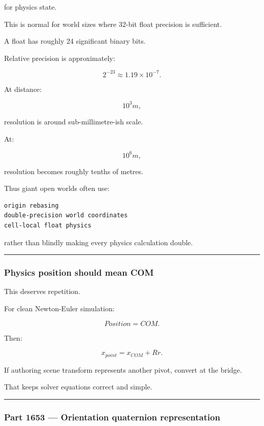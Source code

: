 for physics state.

This is normal for world sizes where 32-bit float precision is sufficient.

A float has roughly 24 significant binary bits.

Relative precision is approximately:

\[
2^{-23}
\approx1.19\times10^{-7}.
\]

At distance:

\[
10^3m,
\]

resolution is around sub-millimetre-ish scale.

At:

\[
10^6m,
\]

resolution becomes roughly tenths of metres.

Thus giant open worlds often use:

\begin{verbatim}
origin rebasing
double-precision world coordinates
cell-local float physics
\end{verbatim}

rather than blindly making every physics calculation double.

\begin{center}\rule{0.5\linewidth}{0.5pt}\end{center}

\subsubsection{Physics position should mean COM}\label{physics-position-should-mean-com}

This deserves repetition.

For clean Newton-Euler simulation:

\[
\boxed{
Position=COM.
}
\]

Then:

\[
x_{point}
=
x_{COM}
+
Rr.
\]

If authoring scene transform represents another pivot, convert at the bridge.

That keeps solver equations correct and simple.

\begin{center}\rule{0.5\linewidth}{0.5pt}\end{center}

\subsubsection{Part 1653 --- Orientation quaternion representation}\label{part-1653-orientation-quaternion-representation}

